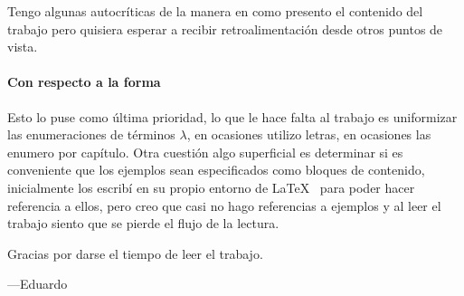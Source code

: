Tengo algunas autocríticas de la manera en como presento el contenido del trabajo pero quisiera esperar a recibir retroalimentación desde otros puntos de vista.

\paragraph{Con respecto a la forma} Esto lo puse como última prioridad, lo que le hace falta al trabajo es uniformizar las enumeraciones de términos \( λ \), en ocasiones utilizo letras, en ocasiones las enumero por capítulo. Otra cuestión algo superficial es determinar si es conveniente que los ejemplos sean especificados como bloques de contenido, inicialmente los escribí en su propio entorno de \LaTeX~ para poder hacer referencia a ellos, pero creo que casi no hago referencias a ejemplos y al leer el trabajo siento que se pierde el flujo de la lectura.

\vfill
\begin{center}
Gracias por darse el tiempo de leer el trabajo.

\qquad ---Eduardo
\end{center}
